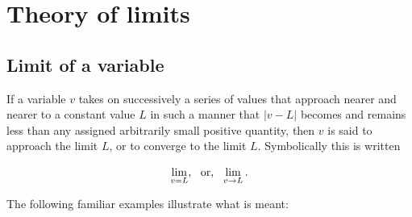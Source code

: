 
\chapter{Theory of limits}
\label{ch:3}

\section{Limit of a variable}
\label{sec:13}

If a variable $v$ takes on successively a series of values 
that approach nearer and nearer to a constant value $L$ 
in such a manner that $| v - L |$ becomes and remains 
less than any assigned arbitrarily small positive quantity, 
then $v$ is said to approach the limit $L$, or to converge 
to the limit $L$. Symbolically this is written

\[
\lim_{v = L},\ \ {\rm or},\ \ \lim_{v \rightarrow L}. 
\]

The following familiar examples illustrate what is meant:

